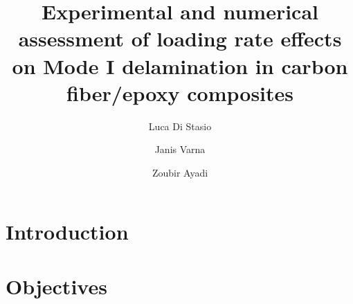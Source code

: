 \documentclass[review]{elsarticle}
\begin{document}
\begin{frontmatter}

\title{Experimental and numerical assessment of loading rate effects on Mode I delamination in carbon fiber/epoxy composites}


\author[nancy,lulea]{Luca Di Stasio}
\author[lulea]{Janis Varna}
\author[nancy]{Zoubir Ayadi}


\address[nancy]{Universit\'e de Lorraine, EEIGM, IJL, 6 Rue Bastien Lepage, F-54010 Nancy, France}
\address[lulea]{Lule\aa\ University of Technology, University Campus, SE-97187 Lule\aa, Sweden}
\address[madrid]{IMDEA Materials Institute, Getafe, Madrid, Spain}
\begin{abstract}
\noindent

\end{abstract}


\end{frontmatter}

\linenumbers

\section{Introduction}



\section{Objectives}
\end{document}
